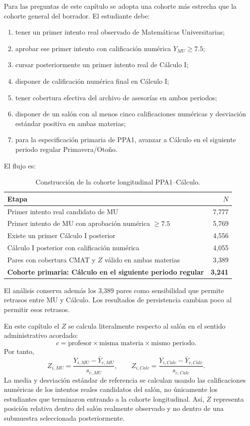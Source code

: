 Para las preguntas de este capítulo se adopta una cohorte más estrecha que la cohorte general del borrador. El estudiante debe:

\begin{enumerate}[label=\arabic*.,leftmargin=*]
\item tener un primer intento real observado de Matemáticas Universitarias;
\item aprobar ese primer intento con calificación numérica $Y_{MU}\geq7.5$;
\item cursar posteriormente un primer intento real de Cálculo I;
\item disponer de calificación numérica final en Cálculo I;
\item tener cobertura efectiva del archivo de asesorías en ambos periodos;
\item disponer de un salón con al menos cinco calificaciones numéricas y desviación estándar positiva en ambas materias;
\item para la especificación primaria de PPA1, avanzar a Cálculo en el siguiente periodo regular Primavera/Otoño.
\end{enumerate}

El flujo es:

\begin{table}[H]
\centering
\caption{Construcción de la cohorte longitudinal PPA1--Cálculo.}
\label{tab:ppa_v8_flow}
\begin{tabularx}{0.92\textwidth}{@{}Xr@{}}
\toprule
Etapa & $N$ \\
\midrule
Primer intento real candidato de MU & 7,777 \\
Primer intento de MU con aprobación numérica $\geq7.5$ & 5,769 \\
Existe un primer Cálculo I posterior & 4,556 \\
Cálculo I posterior con calificación numérica & 4,055 \\
Pares con cobertura CMAT y $Z$ válido en ambas materias & 3,389 \\
\textbf{Cohorte primaria: Cálculo en el siguiente periodo regular} & \textbf{3,241} \\
\bottomrule
\end{tabularx}
\end{table}

El análisis conserva además los 3,389 pares como sensibilidad que permite retrasos entre MU y Cálculo. Los resultados de persistencia cambian poco al permitir esos retrasos.

En este capítulo el $Z$ se calcula literalmente respecto al salón en el sentido administrativo acordado:
\[
\boxed{c=\text{profesor}\times\text{misma materia}\times\text{mismo periodo}.}
\]
Por tanto,
\[
Z_{i,MU}=\frac{Y_{i,MU}-\bar Y_{c,MU}}{s_{c,MU}},
\qquad
Z_{i,Calc}=\frac{Y_{i,Calc}-\bar Y_{c,Calc}}{s_{c,Calc}}.
\]
La media y desviación estándar de referencia se calculan usando las calificaciones numéricas de los intentos reales candidatos del salón, no únicamente los estudiantes que terminaron entrando a la cohorte longitudinal. Así, $Z$ representa posición relativa dentro del salón realmente observado y no dentro de una submuestra seleccionada posteriormente.

